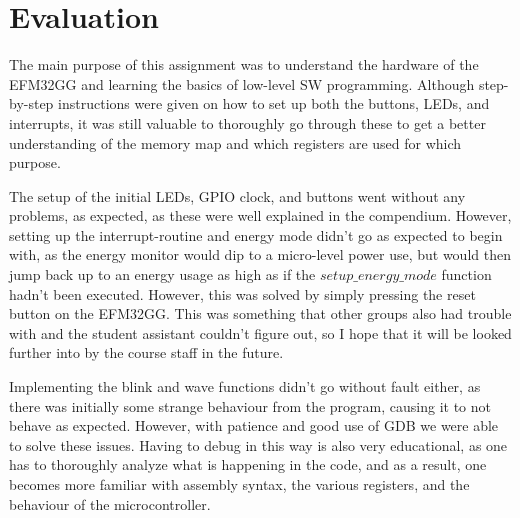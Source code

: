 \section{Evaluation}

The main purpose of this assignment was to understand the hardware of the EFM32GG and learning the basics of low-level SW programming. Although step-by-step instructions were given on how to set up both the buttons, LEDs, and interrupts, it was still valuable to thoroughly go through these to get a better understanding of the memory map and which registers are used for which purpose.

The setup of the initial LEDs, GPIO clock, and buttons went without any problems, as expected, as these were well explained in the compendium\cite{compendium}. However, setting up the interrupt-routine and energy mode didn't go as expected to begin with, as the energy monitor would dip to a micro-level power use, but would then jump back up to an energy usage as high as if the $setup\_energy\_mode$ function hadn't been executed. However, this was solved by simply pressing the reset button on the EFM32GG. This was something that other groups also had trouble with and the student assistant couldn't figure out, so I hope that it will be looked further into by the course staff in the future.

Implementing the blink and wave functions didn't go without fault either, as there was initially some strange behaviour from the program, causing it to not behave as expected. However, with patience and good use of GDB we were able to solve these issues. Having to debug in this way is also very educational, as one has to thoroughly analyze what is happening in the code, and as a result, one becomes more familiar with assembly syntax, the various registers, and the behaviour of the microcontroller.
